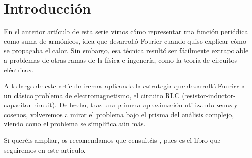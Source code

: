 \section{Introducción}
En el anterior artículo de esta serie vimos cómo representar una función periódica como suma de armónicos, idea que desarrolló Fourier cuando quiso explicar cómo se propagaba el calor. Sin embargo, esa técnica resultó ser fácilmente extrapolable a problemas de otras ramas de la física e ingenería, como la teoría de circuitos eléctricos.

A lo largo de este artículo iremos aplicando la estrategia que desarrolló Fourier a un clásico problema de electromagnetismo, el circuito RLC (resistor-inductor-capacitor circuit). De hecho, tras una primera aproximación utilizando senos y cosenos, volveremos a mirar el problema bajo el prisma del análisis complejo, viendo como el problema se simplifica aún más.

Si queréis ampliar, os recomendamos que consultéis \cite{Sadiku}, pues es el libro que seguiremos en este artículo.


